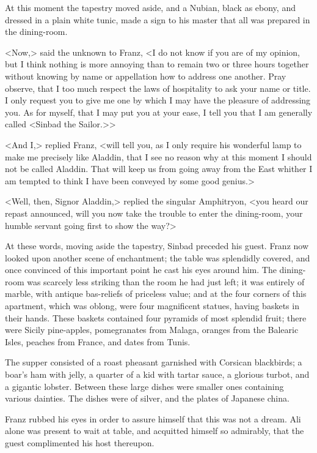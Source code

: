  At this moment the tapestry moved aside, and a Nubian, black as ebony, and dressed in a plain white tunic, made a sign to his master that all was prepared in the dining-room. 

 <Now,> said the unknown to Franz, <I do not know if you are of my opinion, but I think nothing is more annoying than to remain two or three hours together without knowing by name or appellation how to address one another. Pray observe, that I too much respect the laws of hospitality to ask your name or title. I only request you to give me one by which I may have the pleasure of addressing you. As for myself, that I may put you at your ease, I tell you that I am generally called <Sinbad the Sailor.>> 

 <And I,> replied Franz, <will tell you, as I only require his wonderful lamp to make me precisely like Aladdin, that I see no reason why at this moment I should not be called Aladdin. That will keep us from going away from the East whither I am tempted to think I have been conveyed by some good genius.> 

 <Well, then, Signor Aladdin,> replied the singular Amphitryon, <you heard our repast announced, will you now take the trouble to enter the dining-room, your humble servant going first to show the way?> 

 At these words, moving aside the tapestry, Sinbad preceded his guest. Franz now looked upon another scene of enchantment; the table was splendidly covered, and once convinced of this important point he cast his eyes around him. The dining-room was scarcely less striking than the room he had just left; it was entirely of marble, with antique bas-reliefs of priceless value; and at the four corners of this apartment, which was oblong, were four magnificent statues, having baskets in their hands. These baskets contained four pyramids of most splendid fruit; there were Sicily pine-apples, pomegranates from Malaga, oranges from the Balearic Isles, peaches from France, and dates from Tunis. 

 The supper consisted of a roast pheasant garnished with Corsican blackbirds; a boar's ham with jelly, a quarter of a kid with tartar sauce, a glorious turbot, and a gigantic lobster. Between these large dishes were smaller ones containing various dainties. The dishes were of silver, and the plates of Japanese china. 

 Franz rubbed his eyes in order to assure himself that this was not a dream. Ali alone was present to wait at table, and acquitted himself so admirably, that the guest complimented his host thereupon. 

